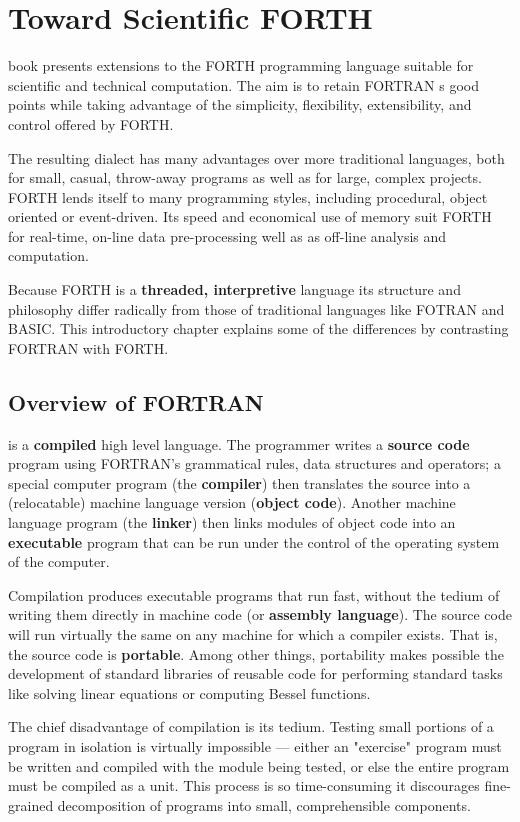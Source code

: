 \chapter{Toward Scientific FORTH}
 book presents extensions to the FORTH programming language suitable for scientific and technical computation. The aim is to retain FORTRAN s good points while taking advantage of the simplicity, flexibility, extensibility, and control offered by FORTH.

The resulting dialect has many advantages over more traditional languages, both for small, casual, throw-away programs as well as for large, complex projects. FORTH lends itself to many programming styles, including procedural, object oriented or event-driven. Its speed and economical use of memory suit FORTH for real-time, on-line data pre-processing well as as off-line analysis and computation.

Because FORTH is a \textbf{threaded, interpretive} language its  structure and philosophy differ radically from those of traditional languages like FOTRAN and BASIC. This introductory chapter explains some of the differences by contrasting FORTRAN with FORTH.

\section{Overview of FORTRAN}
 is a \textbf{compiled} high level language. The programmer writes a \textbf{source code} program using FORTRAN's grammatical rules, data structures and operators; a special computer program (the \textbf{compiler}) then translates the source into a (relocatable) machine language version (\textbf{object code}). Another machine language program (the \textbf{linker}) then links modules of object code into an \textbf{executable} program that can be run under the control of the operating system of the computer.

Compilation produces executable programs that run fast, without the tedium of writing them directly in machine code (or \textbf{assembly language}). The source code will run virtually the same on any machine for which a compiler exists. That is, the source code is \textbf{portable}. Among other things, portability makes possible the development of standard libraries of reusable code for performing standard tasks like solving linear equations or computing Bessel functions.

The chief disadvantage of compilation is its tedium. Testing small portions of a program in isolation is virtually impossible — either an "exercise" program must be written and compiled with the module being tested, or else the entire program must be compiled as a unit. This process is so time-consuming it discourages fine-grained decomposition of programs into small, comprehensible components.
 
